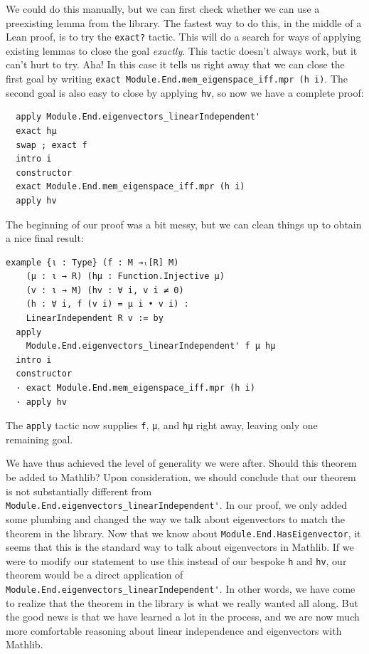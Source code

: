 \documentclass[11pt]{article}
\def\lean{\lstinline[language=lean]}
\begin{document}
We could do this manually, but we can first check whether we can use a preexisting lemma from the library.
The fastest way to do this, in the middle of a Lean proof, is to try the \lean"exact?" tactic.
This will do a search for ways of applying existing lemmas to close the goal \emph{exactly}.
This tactic doesn't always work, but it can't hurt to try.
Aha! In this case it tells us right away that we can close the first goal by writing \lean"exact Module.End.mem_eigenspace_iff.mpr (h i)".
The second goal is also easy to close by applying \texttt{hv}, so now we have a complete proof:
\begin{lstlisting}
  apply Module.End.eigenvectors_linearIndependent'
  exact hμ
  swap ; exact f
  intro i
  constructor
  exact Module.End.mem_eigenspace_iff.mpr (h i)
  apply hv
\end{lstlisting}
The beginning of our proof was a bit messy, but we can clean things up to obtain a nice final result:
\begin{lstlisting}
example {ι : Type} (f : M →ₗ[R] M)
    (μ : ι → R) (hμ : Function.Injective μ)
    (v : ι → M) (hv : ∀ i, v i ≠ 0)
    (h : ∀ i, f (v i) = μ i • v i) :
    LinearIndependent R v := by
  apply
    Module.End.eigenvectors_linearIndependent' f μ hμ
  intro i
  constructor
  · exact Module.End.mem_eigenspace_iff.mpr (h i)
  · apply hv
\end{lstlisting}
The \lean"apply" tactic now supplies \lean"f", \lean"μ", and \lean"hμ" right away, leaving
only one remaining goal.

We have thus achieved the level of generality we were after.
Should this theorem be added to Mathlib?
Upon consideration, we should conclude that our theorem is not substantially different from \lean"Module.End.eigenvectors_linearIndependent'". In our proof, we only added some plumbing and changed the way we talk about eigenvectors to match
the theorem in the library.
Now that we know about \lean"Module.End.HasEigenvector", it seems that this is the standard way to talk about eigenvectors in Mathlib.
If we were to modify our statement to use this instead of our bespoke \texttt{h} and \texttt{hv}, our theorem would be a direct application of \lean"Module.End.eigenvectors_linearIndependent'".
In other words, we have come to realize that the theorem in the library
is what we really wanted all along.
But the good news is that we have learned a lot in the process,
and we are now much more comfortable reasoning about linear independence and eigenvectors with Mathlib.

\end{document}
